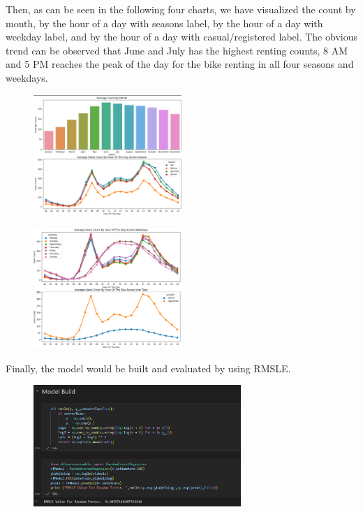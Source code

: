 Then, as can be seen in the following four charts, we have visualized the count by month, by the hour of a day with seasons label, by the hour of a day with weekday label, and by the hour of a day with casual/registered label. The obvious trend can be observed that June and July has the highest renting counts, 8 AM and 5 PM reaches the peak of the day for the bike renting in all four seasons and weekdays.
\begin{figure}[!ht]
	\centering
	\setlength{\abovecaptionskip}{0.cm}
	\setlength{\belowcaptionskip}{-0.cm}
	\includegraphics[width=0.5\textwidth]{./figures/Vis-1.png}
	\label{fig:vis-1}
\end{figure}
\begin{figure}[!ht]
	\centering
	\setlength{\abovecaptionskip}{0.cm}
	\setlength{\belowcaptionskip}{-0.cm}
	\includegraphics[width=0.5\textwidth]{./figures/Vis-2.png}
	\label{fig:vis-2}
\end{figure}

Finally, the model would be built and evaluated by using RMSLE.
\begin{figure}[!ht]
	\centering
	\setlength{\abovecaptionskip}{0.cm}
	\setlength{\belowcaptionskip}{-0.cm}
	\includegraphics[width=0.7\textwidth]{./figures/model.png}
	\label{fig:model}
\end{figure}

